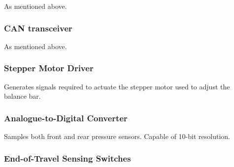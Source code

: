As mentioned above.


\subsubsection{CAN transceiver}

As mentioned above.


\subsubsection{Stepper Motor Driver}

Generates signals required to actuate the stepper motor used to adjust
the balance bar.


\subsubsection{Analogue-to-Digital Converter}

Samples both front and rear pressure sensors. Capable of 10-bit resolution.


\subsubsection{End-of-Travel Sensing Switches}